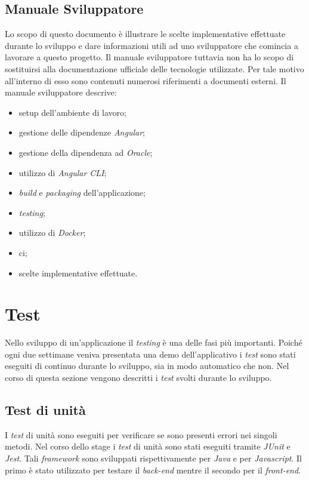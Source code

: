 \subsection{Manuale Sviluppatore}
Lo scopo di questo documento è illustrare le scelte implementative effettuate durante lo sviluppo e dare informazioni utili ad uno sviluppatore che comincia a lavorare a questo progetto.
Il manuale sviluppatore tuttavia non ha lo scopo di sostituirsi alla documentazione ufficiale delle tecnologie utilizzate. Per tale motivo all'interno di esso sono contenuti numerosi riferimenti a documenti esterni.
Il manuale sviluppatore descrive:
\begin{itemize}
    \item setup dell'ambiente di lavoro;
    \item gestione delle dipendenze \textit{Angular};
    \item gestione della dipendenza ad \textit{Oracle};
    \item utilizzo di \textit{Angular CLI};
    \item \textit{build} e \textit{packaging} dell'applicazione;
    \item \textit{testing};
    \item utilizzo di \textit{Docker};
    \item \gls{ci};
    \item scelte implementative effettuate.
\end{itemize}

\section{Test}
Nello sviluppo di un'applicazione il \textit{testing} è una delle fasi più importanti. Poiché ogni due settimane veniva presentata una demo dell'applicativo i \textit{test} sono stati eseguiti di continuo durante lo sviluppo, sia in modo automatico che non. Nel corso di questa sezione vengono descritti i \textit{test} svolti durante lo sviluppo.

\subsection{Test di unità}
I \textit{test} di unità sono eseguiti per verificare se sono presenti errori nei singoli metodi. Nel corso dello stage i \textit{test} di unità sono stati eseguiti tramite \textit{JUnit} e \textit{Jest}. Tali \textit{framework} sono sviluppati rispettivamente per \textit{Java} e per \textit{Javascript}. Il primo è stato utilizzato per testare il \textit{back-end} mentre il secondo per il \textit{front-end}.


